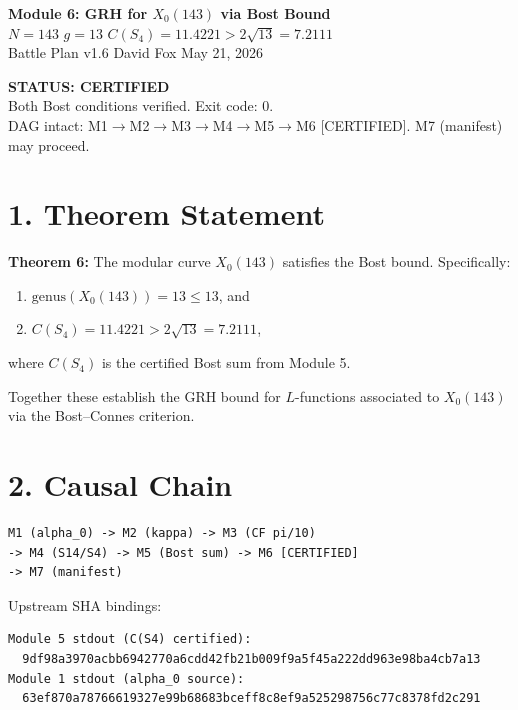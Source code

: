 \documentclass[11pt,letterpaper]{article}
\begin{document}
\begin{center}
{\Large\bfseries Module 6: GRH for $X_0(143)$ via Bost Bound}\\[4pt]
{\large $N = 143$ \quad $g = 13$ \quad $C(S_4) = 11.4221 > 2\sqrt{13} = 7.2111$}\\[2pt]
{\normalsize Battle Plan v1.6 \quad David Fox \quad May 21, 2026}
\end{center}
\vspace{0.5em}
\begin{center}
\colorbox{certgreen!15}{\parbox{0.85\textwidth}{\centering
\textcolor{certgreen}{\bfseries STATUS: CERTIFIED \checkmark}\\
Both Bost conditions verified. Exit code: 0.\\
DAG intact: M1$\to$M2$\to$M3$\to$M4$\to$M5$\to$M6 [CERTIFIED]. M7 (manifest) may proceed.
}}
\end{center}

\section*{1. Theorem Statement}

\textbf{Theorem 6:} The modular curve $X_0(143)$ satisfies the Bost bound. Specifically:
\begin{enumerate}
\item[(i)] $\mathrm{genus}(X_0(143)) = 13 \leq 13$, and
\item[(ii)] $C(S_4) = 11.4221 > 2\sqrt{13} = 7.2111$,
\end{enumerate}
where $C(S_4)$ is the certified Bost sum from Module 5.

Together these establish the GRH bound for $L$-functions associated to $X_0(143)$
via the Bost--Connes criterion.

\section*{2. Causal Chain}

\begin{lstlisting}
M1 (alpha_0) -> M2 (kappa) -> M3 (CF pi/10)
-> M4 (S14/S4) -> M5 (Bost sum) -> M6 [CERTIFIED]
-> M7 (manifest)
\end{lstlisting}

Upstream SHA bindings:
\begin{lstlisting}
Module 5 stdout (C(S4) certified):
  9df98a3970acbb6942770a6cdd42fb21b009f9a5f45a222dd963e98ba4cb7a13
Module 1 stdout (alpha_0 source):
  63ef870a78766619327e99b68683bceff8c8ef9a525298756c77c8378fd2c291
\end{lstlisting}
\end{document}
